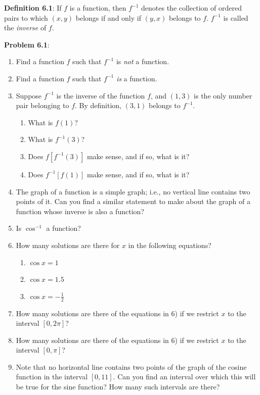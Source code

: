 \documentclass[english]{book}
\begin{document}
\vspace{0.3cm}

\textbf{Definition 6.1}: If $f$ is a function, then $f^{-1}$ denotes the collection of ordered pairs to which $(x,y)$ belongs if and only if $(y,x)$ belongs to $f$. $f^{-1}$ is called the \emph{inverse} of $f$.

\vspace{0.3cm}

\textbf{Problem 6.1}:
\begin{enumerate}[\hspace{1cm}1)]
  \item Find a function $f$ such that $f^{-1}$ is \emph{not} a function.
  \item Find a function $f$ such that $f^{-1}$ \emph{is} a function.
  \item Suppose $f^{-1}$ is the inverse of the function $f$, and $(1,3)$ is the only number pair belonging to $f$. By definition, $(3,1)$ belongs to $f^{-1}$.
    \begin{enumerate}[\hspace{1cm}a)]
      \item What is $f(1)$?
      \item What is $f^{-1}(3)$?
      \item Does $f[f^{-1}(3)]$ make sense, and if so, what is it?
      \item Does $f^{-1}[f(1)]$ make sense, and if so, what is it?
    \end{enumerate}
  \item The graph of a function is a simple graph; i.e., no vertical line contains two points of it. Can you find a similar statement to make about the graph of a function whose inverse is also a function?
  \item Is $\cos^{-1}$ a function?
  \item How many solutions are there for $x$ in the following equations?
    \begin{enumerate}[\hspace{1cm}a)]
      \item $\cos x = 1$
      \item $\cos x = 1.5$
      \item $\cos x = -\frac{1}{2}$
    \end{enumerate}
  \item How many solutions are there of the equations in 6) if we restrict $x$ to the interval $[0,2\pi]$?
  \item How many solutions are there of the equations in 6) if we restrict $x$ to the interval $[0,\pi]$?
  \item Note that no horizontal line contains two points of the graph of the cosine function in the interval $[0,11]$. Can you find an interval over which this will be true for the sine function? How many such intervals are there?
\end{enumerate}
\end{document}
